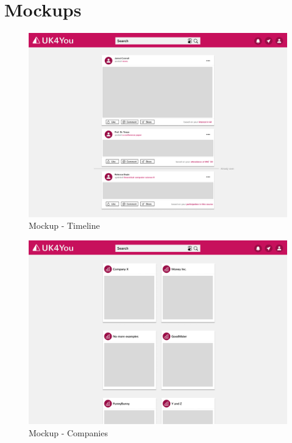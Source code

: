 \section{Mockups}\label{sec:mockups}

\begin{figure}[ht]
    \centering
    \includegraphics[width=1\columnwidth]{figures/timeline.pdf}
    \caption{\label{fig:timeline} Mockup - Timeline}
\end{figure}

\begin{figure}[ht]
    \centering
    \includegraphics[width=1\columnwidth]{figures/company.pdf}
    \caption{\label{fig:company} Mockup - Companies}
\end{figure}

